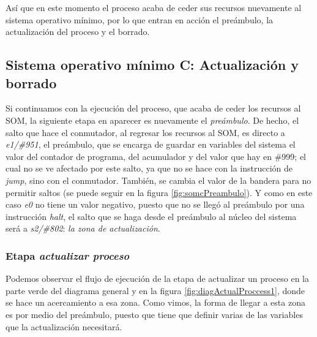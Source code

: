 \documentclass[letterpaper,12pt,oneside]{book}
\begin{document}
        Así que en este momento el proceso acaba de ceder sus recursos nuevamente al sistema operativo mínimo, por lo que entran en acción
        el preámbulo, la actualización del proceso y el borrado.
		
		\clearpage		

        \subsection{Sistema operativo mínimo C: Actualización y borrado}
        
		
		Si continuamos con la ejecución del proceso, que acaba de ceder los recursos al SOM, la siguiente etapa en aparecer
		es nuevamente el \textit{preámbulo}. 
		De hecho, el salto que hace el conmutador, al regresar los recursos al SOM, es directo a \textit{e1/\#951}, el preámbulo, que 
		se encarga de guardar en variables del sistema
		el valor del contador de programa, del acumulador y del valor que hay en \#999; el cual no se ve afectado por este salto, ya que no se hace
		con la instrucción de \textit{jump}, sino con el conmutador.
		También, se cambia el valor de la bandera
		para no permitir saltos (se puede seguir en la figura \ref{fig:somcPreambulo}). Y como en este caso
		\textit{e0} no tiene un valor negativo, puesto que no se llegó al preámbulo por una instrucción \textit{halt},
		el salto que se haga desde el preámbulo al núcleo del sistema será a \textit{s2/\#802}: \textit{la zona de actualización}.
  
        \subsubsection{Etapa \textit{actualizar proceso}}
  
        Podemos observar
		el flujo de ejecución de la etapa de actualizar un proceso
		en la parte verde del diagrama general y en la figura \ref{fig:diagActualProccess1}, donde se hace 
		un acercamiento a esa zona. Como vimos, la forma de llegar a esta zona es por medio del preámbulo, puesto que tiene que definir
		varias de las variables que la actualización necesitará.
		
\end{document}
